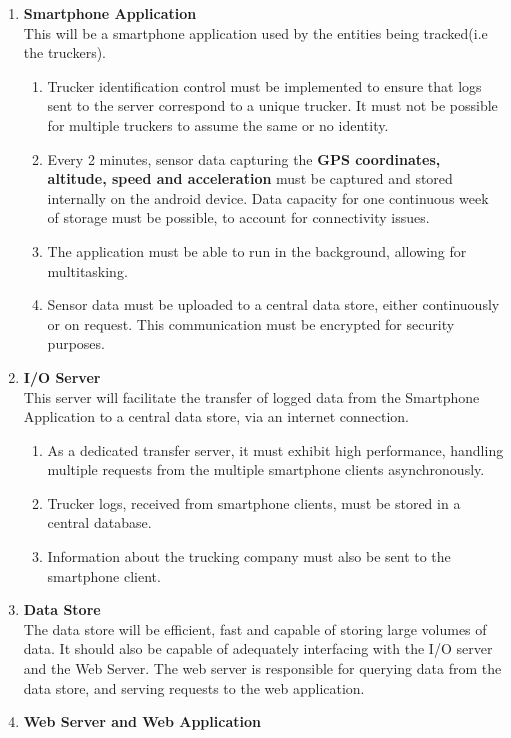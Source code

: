 \begin{enumerate}
\item \textbf{Smartphone Application}\\
    This will be a smartphone application used by the entities being tracked(i.e the truckers).
    \begin{enumerate}
        \item Trucker identification control must be implemented to ensure that logs sent to the server correspond to a unique trucker. It must not be possible for multiple truckers to assume the same or no identity.
        \item Every 2 minutes, sensor data capturing the \textbf{GPS coordinates, altitude, speed and acceleration} must be captured and stored internally on the android device. 
        Data capacity for one continuous week of storage must be possible, to account for connectivity issues.
        \item The application must be able to run in the background, allowing for multitasking.
        \item Sensor data must be uploaded to a central data store, either continuously or on request. This communication must be encrypted for security purposes.
    \end{enumerate}
\item \textbf{I/O Server}\\
This server will facilitate the transfer of logged data from the Smartphone Application to a central data store, via an internet connection. 
    \begin{enumerate}
        \item As a dedicated transfer server, it must exhibit high performance, handling multiple requests from the multiple smartphone clients asynchronously.
        \item Trucker logs, received from smartphone clients, must be stored in a central database.
        \item Information about the trucking company must also be sent to the smartphone client.
    \end{enumerate}
\item \textbf{Data Store}\\
The data store will be efficient, fast and capable of storing large volumes of data.
It should also be capable of adequately interfacing with the I/O server and the Web Server.
The web server is responsible for querying data from the data store, and serving requests to the web application.
\item \textbf{Web Server and Web Application}\\

\end{enumerate}

